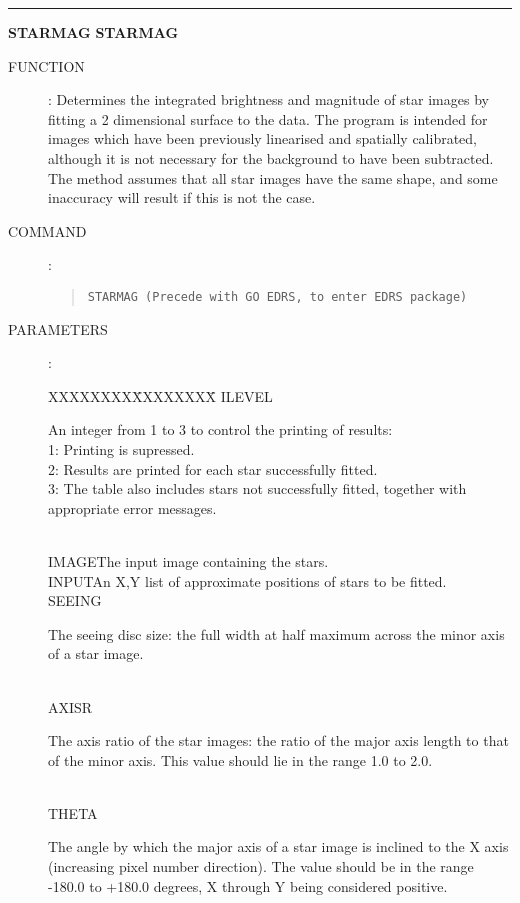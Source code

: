 \goodbreak
\rule{\textwidth}{0.3mm}
{\Large {\bf STARMAG} \hfill {\bf STARMAG}}
\begin{description}
\item [FUNCTION]:
Determines the integrated brightness and magnitude of star images by fitting
a 2 dimensional surface to the data.
The program is intended for images which have been previously linearised and
spatially calibrated, although it is not necessary for the background to have
been subtracted.
The method assumes that all star images have the same shape, and some
inaccuracy will result if this is not the case.
\item [COMMAND]:
\begin{quote}
{\tt STARMAG  (Precede with GO EDRS, to enter EDRS package)}
\end{quote}
\item [PARAMETERS] :
\begin{tabbing}
XXXXXXXX\=XXXXXXXX\=\kill
ILEVEL\>\begin{minipage}[t]{100mm}
An integer from 1 to 3 to control the printing of results:\\
1: Printing is supressed.\\
2: Results are printed for each star successfully fitted.\\
3: The table also includes stars not successfully fitted, together with
appropriate error messages.
\end{minipage}\\
IMAGE\>\>The input image containing the stars.\\
INPUT\>\>An X,Y list of approximate positions of stars to be fitted.\\
SEEING\>\>\begin{minipage}[t]{100mm}
The seeing disc size: the full width at half maximum across the minor axis of
a star image.
\end{minipage}\\
AXISR\>\begin{minipage}[t]{100mm}
The axis ratio of the star images: the ratio of the major axis length to that
of the minor axis.
This value should lie in the range 1.0 to 2.0.
\end{minipage}\\
THETA\>\begin{minipage}[t]{100mm}
The angle by which the major axis of a star image is inclined to the X axis
(increasing pixel number direction).
The value should be in the range  -180.0 to +180.0 degrees, X through Y being
considered positive.
\end{minipage}\\

\end{tabbing}
\end{description}
